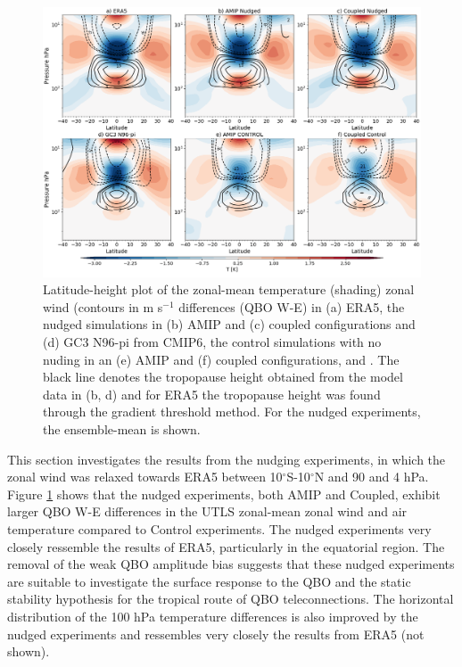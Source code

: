 \begin{figure}[t!]
\centering
 \includegraphics[width=\linewidth]{figures/zonal_thesis.png}
\caption[Zonal-mean zonal wind QBO difference]{Latitude-height plot of the zonal-mean temperature (shading) zonal wind (contours in m s$^{-1}$ differences (QBO W-E) in (a) ERA5, the nudged simulations in (b) AMIP and (c) coupled configurations and (d) GC3 N96-pi from CMIP6, the control simulations with no nuding in an (e) AMIP and (f) coupled configurations, and . The black line denotes the tropopause height obtained from the model data in (b, d) and for ERA5 the tropopause height was found through the gradient threshold method. For the nudged experiments, the ensemble-mean is shown.  }
\label{fig:zonal_u}
\end{figure}

This section investigates the results from the nudging experiments, in which the zonal wind was relaxed towards ERA5 between 10$^\circ$S-10$^\circ$N and 90 and 4 hPa.
Figure \ref{fig:zonal_u} shows that the nudged experiments, both AMIP and Coupled, exhibit larger QBO W-E differences in the UTLS zonal-mean zonal wind and air temperature compared to Control experiments. The nudged experiments very closely ressemble the results of ERA5, particularly in the equatorial region. The removal of the weak QBO amplitude bias suggests that these nudged experiments are suitable to investigate the surface response to the QBO and the static stability hypothesis for the tropical route of QBO teleconnections.
The horizontal distribution of the 100 hPa temperature differences is also improved by the nudged experiments and ressembles very closely the results from ERA5 (not shown).

